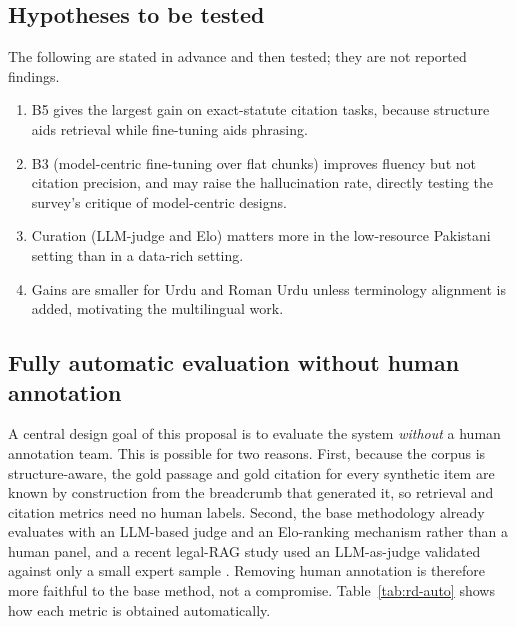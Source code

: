 \documentclass[10pt,twocolumn]{article}
\begin{document}
\subsection{Hypotheses to be tested}
\label{sec:rd-hypotheses}

The following are stated in advance and then tested; they are not reported findings.
\begin{enumerate}[leftmargin=1.4em, itemsep=2pt, topsep=2pt]
\item B5 gives the largest gain on exact-statute citation tasks, because structure aids retrieval while
fine-tuning aids phrasing.
\item B3 (model-centric fine-tuning over flat chunks) improves fluency but not citation precision, and
may raise the hallucination rate, directly testing the survey's critique of model-centric designs.
\item Curation (LLM-judge and Elo) matters more in the low-resource Pakistani setting than in a
data-rich setting.
\item Gains are smaller for Urdu and Roman Urdu unless terminology alignment is added, motivating the
multilingual work.
\end{enumerate}

\subsection{Fully automatic evaluation without human annotation}
\label{sec:rd-auto}

A central design goal of this proposal is to evaluate the system \emph{without} a human annotation team.
This is possible for two reasons. First, because the corpus is structure-aware, the gold passage and gold
citation for every synthetic item are known by construction from the breadcrumb that generated it, so
retrieval and citation metrics need no human labels. Second, the base methodology \citep{ren2026} already
evaluates with an LLM-based judge and an Elo-ranking mechanism rather than a human panel, and a recent
legal-RAG study used an LLM-as-judge validated against only a small expert sample \citep{silva2026}.
Removing human annotation is therefore more faithful to the base method, not a compromise.
Table~\ref{tab:rd-auto} shows how each metric is obtained automatically.
\end{document}
